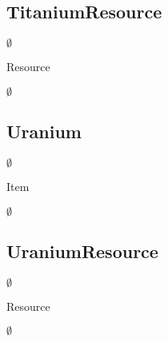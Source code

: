 \subsection{TitaniumResource}
\begin{class-template-responsibility}

\end{class-template-responsibility}
\begin{class-template-interface}
$\emptyset$
\end{class-template-interface}
\begin{class-template-baseclass}
Resource
\end{class-template-baseclass}
\begin{class-template-attribute}
\item[] $\emptyset$
\end{class-template-attribute}
\begin{class-template-method}
\end{class-template-method}


\subsection{Uranium}
\begin{class-template-responsibility}

\end{class-template-responsibility}
\begin{class-template-interface}
$\emptyset$
\end{class-template-interface}
\begin{class-template-baseclass}
Item
\end{class-template-baseclass}
\begin{class-template-attribute}
\item[] $\emptyset$
\end{class-template-attribute}
\begin{class-template-method}
\end{class-template-method}


\subsection{UraniumResource}
\begin{class-template-responsibility}

\end{class-template-responsibility}
\begin{class-template-interface}
$\emptyset$
\end{class-template-interface}
\begin{class-template-baseclass}
Resource
\end{class-template-baseclass}
\begin{class-template-attribute}
\item[] $\emptyset$
\end{class-template-attribute}
\begin{class-template-method}
\end{class-template-method}



